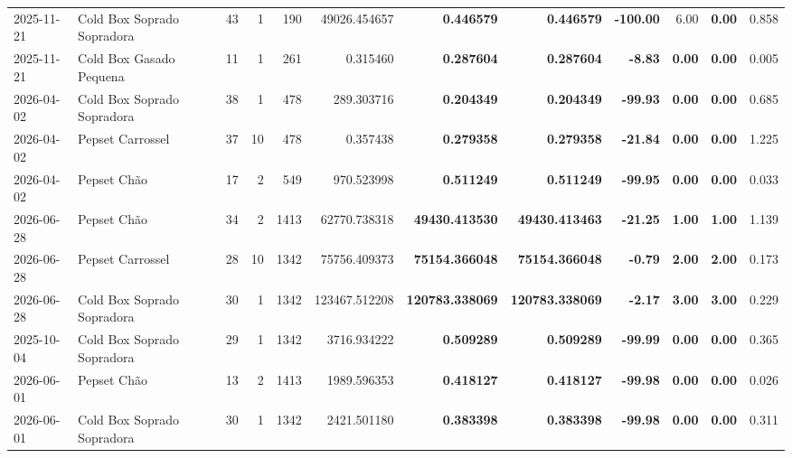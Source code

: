 {\begin{center}
{\begin{tabular}{@{}llrrrrrrrrrr@{}}
2025-11-21 & Cold Box Soprado Sopradora & 43 & 1 & 190 & 49026.454657 & \textbf{0.446579} & \textbf{0.446579} & \textbf{-100.00} & 6.00 & \textbf{0.00} & 0.858 \\
2025-11-21 & Cold Box Gasado Pequena & 11 & 1 & 261 & 0.315460 & \textbf{0.287604} & \textbf{0.287604} & \textbf{-8.83} & \textbf{0.00} & \textbf{0.00} & 0.005 \\
2026-04-02 & Cold Box Soprado Sopradora & 38 & 1 & 478 & 289.303716 & \textbf{0.204349} & \textbf{0.204349} & \textbf{-99.93} & \textbf{0.00} & \textbf{0.00} & 0.685 \\
2026-04-02 & Pepset Carrossel & 37 & 10 & 478 & 0.357438 & \textbf{0.279358} & \textbf{0.279358} & \textbf{-21.84} & \textbf{0.00} & \textbf{0.00} & 1.225 \\
2026-04-02 & Pepset Chão & 17 & 2 & 549 & 970.523998 & \textbf{0.511249} & \textbf{0.511249} & \textbf{-99.95} & \textbf{0.00} & \textbf{0.00} & 0.033 \\
2026-06-28 & Pepset Chão & 34 & 2 & 1413 & 62770.738318 & \textbf{49430.413530} & \textbf{49430.413463} & \textbf{-21.25} & \textbf{1.00} & \textbf{1.00} & 1.139 \\
2026-06-28 & Pepset Carrossel & 28 & 10 & 1342 & 75756.409373 & \textbf{75154.366048} & \textbf{75154.366048} & \textbf{-0.79} & \textbf{2.00} & \textbf{2.00} & 0.173 \\
2026-06-28 & Cold Box Soprado Sopradora & 30 & 1 & 1342 & 123467.512208 & \textbf{120783.338069} & \textbf{120783.338069} & \textbf{-2.17} & \textbf{3.00} & \textbf{3.00} & 0.229 \\
2025-10-04 & Cold Box Soprado Sopradora & 29 & 1 & 1342 & 3716.934222 & \textbf{0.509289} & \textbf{0.509289} & \textbf{-99.99} & \textbf{0.00} & \textbf{0.00} & 0.365 \\
2026-06-01 & Pepset Chão & 13 & 2 & 1413 & 1989.596353 & \textbf{0.418127} & \textbf{0.418127} & \textbf{-99.98} & \textbf{0.00} & \textbf{0.00} & 0.026 \\
2026-06-01 & Cold Box Soprado Sopradora & 30 & 1 & 1342 & 2421.501180 & \textbf{0.383398} & \textbf{0.383398} & \textbf{-99.98} & \textbf{0.00} & \textbf{0.00} & 0.311 \\
\bottomrule
\end{tabular}%
}
\end{center}
}
\newpage
\vspace*{\fill}
